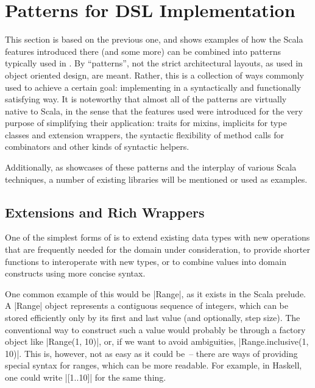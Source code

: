 \chapter{Patterns for DSL Implementation}
\label{sec:patterns}

This section is based on the previous one, and shows examples of how the Scala features introduced
there (and some more) can be combined into patterns typically used in \dsls. By \enquote{patterns},
not the strict architectural layouts, as used in object oriented design, are meant. Rather, this is
a collection of ways commonly used to achieve a certain goal: implementing \dsls{} in a
syntactically and functionally satisfying way. It is noteworthy that almost all of the patterns are
virtually native to Scala, in the sense that the features used were introduced for the very purpose
of simplifying their application: traits for mixins, implicits for type classes and extension
wrappers, the syntactic flexibility of method calls for combinators and other kinds of syntactic
\dsl{} helpers.

Additionally, as showcases of these patterns and the interplay of various Scala techniques, a number
of existing \dsl{} libraries will be mentioned or used as examples.

\section{Extensions and Rich Wrappers}
\label{sec:extensions}

One of the simplest forms of \dsls{} is to extend existing data types with new operations that are
frequently needed for the domain under consideration, to provide shorter functions to interoperate
with new types, or to combine values into domain constructs using more concise syntax.

One common example of this would be |Range|, as it exists in the Scala prelude. A |Range| object
represents a contiguous sequence of integers, which can be stored efficiently only by its first and
last value (and optionally, step size). The conventional way to construct such a value would
probably be through a factory object like |Range(1, 10)|, or, if we want to avoid ambiguities, %
|Range.inclusive(1, 10)|. This is, however, not as easy as it could be~-- there are ways of
providing special syntax for ranges, which can be more readable. For example, in Haskell, one could
write |[1..10]| for the same thing.

